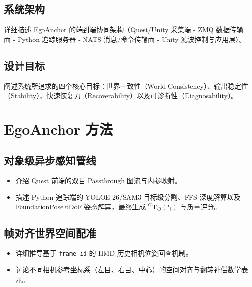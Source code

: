 \documentclass[review]{vgtc}
\begin{document}
\subsection{系统架构}
详细描述 EgoAnchor 的端到端协同架构（Quest/Unity 采集端 - ZMQ 数据传输面 - Python 追踪服务器 - NATS 消息/命令传输面 - Unity 滤波控制与应用层）。

\subsection{设计目标}
阐述系统所追求的四个核心目标：世界一致性（World Consistency）、输出稳定性（Stability）、快速恢复力（Recoverability）以及可诊断性（Diagnosability）。

\section{EgoAnchor 方法}

\subsection{对象级异步感知管线}
\begin{itemize}
  \item 介绍 Quest 前端的双目 Passthrough 图流与内参映射。
  \item 描述 Python 追踪端的 YOLOE-26/SAM3 目标级分割、FFS 深度解算以及 FoundationPose 6DoF 姿态解算，最终生成 ${}^{C}\mathbf{T}_{O}(t_i)$ 与质量评分。
\end{itemize}

\subsection{帧对齐世界空间配准}
\begin{itemize}
  \item 详细推导基于 \texttt{frame\_id} 的 HMD 历史相机位姿回查机制。
  \item 讨论不同相机参考坐标系（左目、右目、中心）的空间对齐与翻转补偿数学表示。
\nobreak
\end{itemize}
\end{document}
